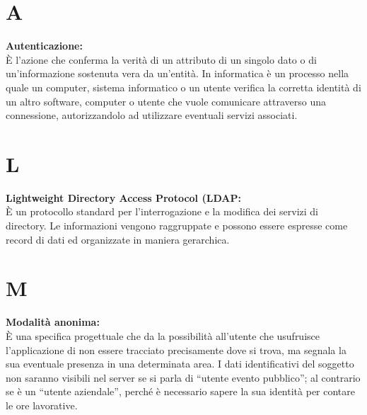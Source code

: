 \documentclass[a4paper, oneside, dvipsnames, table]{article}
\begin{document}
\copertina{}
\newpage



\fancyglossario{}

\clearpage
\tableofcontents
\clearpage

\section{A}
\textbf{Autenticazione:}\\
È l’azione che conferma la verità di un attributo di un singolo dato o di un’informazione sostenuta vera da un’entità. In informatica è un processo nella quale un computer, sistema informatico o un utente verifica la corretta identità di un altro software, computer o utente che vuole comunicare attraverso una connessione, autorizzandolo  ad utilizzare eventuali servizi associati.


\section{L}
\textbf{Lightweight Directory Access Protocol (LDAP:}\\
È un protocollo standard per l'interrogazione e la modifica dei servizi di directory. Le informazioni vengono raggruppate e possono essere espresse come record di dati ed organizzate in maniera gerarchica.

\section{M}
\textbf{Modalità anonima:}\\
È una specifica progettuale che da la possibilità all’utente che usufruisce l’applicazione di non essere tracciato precisamente dove si trova, ma segnala la sua eventuale presenza in una determinata area. I dati identificativi del soggetto non saranno visibili nel server se si parla di “utente evento pubblico”; al contrario se è un “utente aziendale”, perché è necessario sapere la sua identità per contare le ore lavorative.
\end{document}
